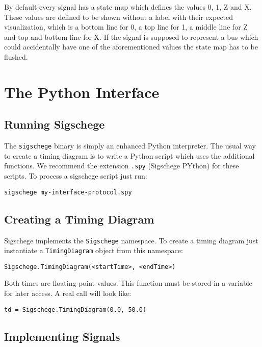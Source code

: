 \documentclass[11pt]{article}
\begin{document}
By default every signal has a state map which defines the values 0, 1, Z and
X. These values are defined to be shown without a label with their expected
visualization, which is a bottom line for 0, a top line for 1, a middle line for
Z and top and bottom line for X. If the signal is supposed to represent a bus
which could accidentally have one of the aforementioned values the state map has
to be flushed.


\section{The Python Interface}
\label{sec:python}

\subsection{Running Sigschege}

The \texttt{sigschege} binary is simply an enhanced Python interpreter. The
usual way to create a timing diagram is to write a Python script which uses the
additional functions. We recommend the extension \texttt{.spy} (Sigschege PYthon) for these
scripts. To process a sigschege script just run:

\begin{center}
  \texttt{sigschege my-interface-protocol.spy}
\end{center}


\subsection{Creating a Timing Diagram}

Sigschege implements the \texttt{Sigschege} namespace. To create a timing
diagram just instantiate a \texttt{TimingDiagram} object from this namespace:


\begin{center}
  \texttt{Sigschege.TimingDiagram(<startTime>, <endTime>)}
\end{center}

Both times are floating point values.
This function must be stored in a variable for later access. A real call will
look like:

\begin{center}
  \texttt{td = Sigschege.TimingDiagram(0.0, 50.0)}
\end{center}

\subsection{Implementing Signals}
\label{sec:sig}
\end{document}
